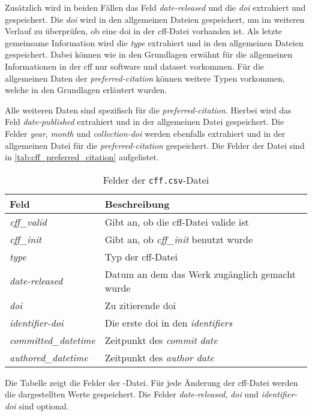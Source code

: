 Zusätzlich wird in beiden Fällen das Feld \emph{date-released} und die \emph{doi} extrahiert und gespeichert.
Die \emph{doi} wird in den allgemeinen Dateien gespeichert, um im weiteren Verlauf zu überprüfen, ob eine \gls{doi} in der \gls{cff}-Datei vorhanden ist.
Als letzte gemeinsame Information wird die \emph{type} extrahiert und in den allgemeinen Dateien gespeichert.
Dabei können wie in den Grundlagen erwähnt für die allgemeinen Informationen in der \gls{cff} nur \glqq software\grqq{} und \glqq dataset\grqq{} vorkommen.
Für die allgemeinen Daten der \emph{preferred-citation} können weitere Typen vorkommen, welche in den Grundlagen erläutert wurden.

Alle weiteren Daten sind spezifisch für die \emph{preferred-citation}.
Hierbei wird das Feld \emph{date-published} extrahiert und in der allgemeinen Datei  gespeichert.
Die Felder \emph{year}, \emph{month} und \emph{collection-doi} werden ebenfalls extrahiert und in der allgemeinen Datei für die \emph{preferred-citation} gespeichert.
Die Felder der Datei sind in \autoref{tab:cff_preferred_citation} aufgelistet.

\begin{table}
    \begin{tabularx}{\textwidth}{XL{10.2cm}}
        \toprule
        \textbf{Feld}              & \textbf{Beschreibung}                               \\ \midrule
        \emph{cff\_valid}          & Gibt an, ob die \gls{cff}-Datei valide ist          \\
        \emph{cff\_init}           & Gibt an, ob \emph{cff\_init} benutzt wurde          \\
        \emph{type}                & Typ der \gls{cff}-Datei                             \\
        \emph{date-released}       & Datum an dem das Werk zugänglich gemacht wurde      \\
        \emph{doi}                 & Zu zitierende \gls{doi}                             \\
        \emph{identifier-doi}      & Die erste \gls{doi} in den \emph{identifiers} \\
        \emph{committed\_datetime} & Zeitpunkt des \emph{commit date}                    \\
        \emph{authored\_datetime}  & Zeitpunkt des \emph{author date}                    \\
        \bottomrule
    \end{tabularx}
    \caption{Felder der \texttt{cff.csv}-Datei}
    \label{tab:cff}
    \small
    Die Tabelle zeigt die Felder der -Datei. Für jede Änderung der \gls{cff}-Datei werden die dargestellten Werte gespeichert. Die Felder \emph{date-released}, \emph{doi} und \emph{identifier-doi} sind optional.
\end{table}

